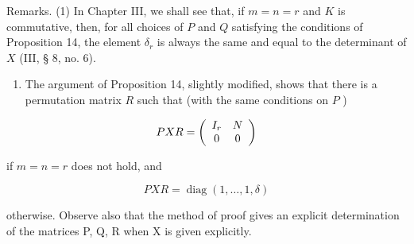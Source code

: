 Remarks. (1) In Chapter III, we shall see that, if \(m = n = r\) and \(K\) is commutative, then, for all choices of \(P\) and \(Q\) satisfying the conditions of Proposition 14, the element \(\delta_r\) is always the same and equal to the determinant of \(X\) (III, § 8, no. 6).

\begin{enumerate}
\def\labelenumi{(\arabic{enumi})}
\setcounter{enumi}{1}
\tightlist
\item
  The argument of Proposition 14, slightly modified, shows that there is a permutation matrix \(R\) such that (with the same conditions on \(P\) )
\end{enumerate}

\[
P X R = \left( \begin{array}{c c} I _ {r} & N \\ 0 & 0 \end{array} \right)
\]

if \(m = n = r\) does not hold, and

\[
P X R = \operatorname{diag} (1, \dots , 1, \delta)
\]

otherwise. Observe also that the method of proof gives an explicit determination of the matrices P, Q, R when X is given explicitly.

